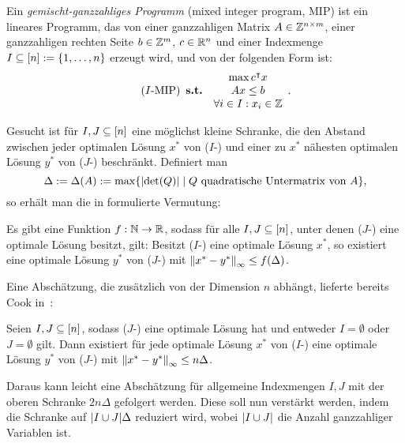Ein \emph{gemischt-ganzzahliges Programm} (mixed integer program, MIP) ist ein lineares Programm, das von einer ganzzahligen Matrix $A\in\mathbb{Z}^{n\times m}$, einer ganzzahligen rechten Seite $b\in\mathbb{Z}^m$, $c\in\mathbb{R}^n$ und einer Indexmenge $I\subseteq[n]:=\{1,\dots,n\}$ erzeugt wird, und von der folgenden Form ist:
\begin{equation}\tag{$I$-\MIPI}
\begin{array}{lc}
&\max c\transpose x \\
\subjectTo &Ax\leq b\\
&\forall i\in I: x_i\in\Z
\end{array}.
\end{equation}

Gesucht ist für $I,J\subseteq[n]$ eine möglichst kleine Schranke, die den Abstand zwischen jeder optimalen Lösung $x^*$ von ($I$-\MIPI) und einer zu $x^*$ nähesten optimalen Lösung $y^*$ von ($J$-\MIPI) beschränkt.
Definiert man
$$\Delta:=\Delta(A):=\max\{\lvert  \det(Q) \rvert \mid Q \text{ quadratische Untermatrix von } A \},$$
so erhält man die in \cite{Paat2018} formulierte Vermutung:

\begin{conjecture}\label{con:delta}
	Es gibt eine Funktion $f: \mathbb{N}\rightarrow\mathbb{R}$, sodass für alle $I,J\subseteq[n]$, unter denen ($J$-\MIPI) eine optimale Lösung besitzt, gilt:
	Besitzt ($I$-\MIPI) eine optimale Lösung $x^*$, so existiert eine optimale 
	Lösung $y^*$ von ($J$-\MIPI) mit $\left\lVert x^* - y^*\right\rVert_\infty\leq f(\Delta)$.
\end{conjecture}

Eine Abschätzung, die zusätzlich von der Dimension $n$ abhängt, lieferte bereits Cook in~\cite[Theorem 1 und Bemerkung 1]{Cook1986}:

\begin{theorem}[Cook et al., 1986]\label{thm:cook}
	Seien $I, J\subseteq[n]$, sodass ($J$-\MIPI) eine optimale Lösung hat und entweder $I=\emptyset$ oder $J=\emptyset$ gilt.
	Dann existiert für jede optimale Lösung $x^*$ von ($I$-\MIPI) eine optimale Lösung $y^*$ von ($J$-\MIPI) mit $\left\lVert x^*-y^*\right\rVert_\infty\leq n\Delta$.
\end{theorem}

Daraus kann leicht eine Abschätzung für allgemeine Indexmengen $I,J$ mit der oberen Schranke $2n\Delta$ gefolgert werden.
Diese soll nun verstärkt werden, indem die Schranke auf $\lvert I\cup J \rvert\Delta$ reduziert wird, wobei $\lvert I\cup J \rvert$ die Anzahl ganzzahliger Variablen ist.

